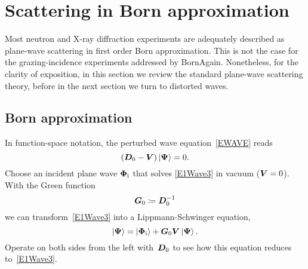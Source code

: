 \section{Scattering in Born approximation}\label{SBA}

Most neutron and X-ray diffraction experiments
are adequately described as plane-wave scattering in first order
Born approximation.
This is not the case for the grazing-incidence experiments addressed by BornAgain.
Nonetheless, for the clarity of exposition,
in this section we review the standard plane-wave scattering theory,
before in the next section we turn to distorted waves.

\subsection{Born approximation}\label{SxBA}

In function-space notation, the perturbed wave equation~\cref{EWAVE} reads
\begin{equation}\label{E1Wave3}
  (\TDo-\TV)\ket{\v\Psi} = 0.
\end{equation}
Choose an incident plane wave $\bm{\Phi}_{\text{i}}$ that solves \cref{E1Wave3} in vacuum ($\bm{V}=0$).
With the Green function
%
%
\begin{equation}\label{EdefG}
   \TGo \coloneqq \TDo^{-1}
\end{equation}
we can transform~\cref{E1Wave3} into a Lippmann-Schwinger equation,
%
\begin{equation}\label{E1LS3}
   \ket{\v\Psi} = \ket{\v\Phi_\si} + \TGo\TV\ket{\v\Psi}.
\end{equation}
Operate on both sides from the left with~$\bm{D}_0$
to see how this equation reduces to~\cref{E1Wave3}.


